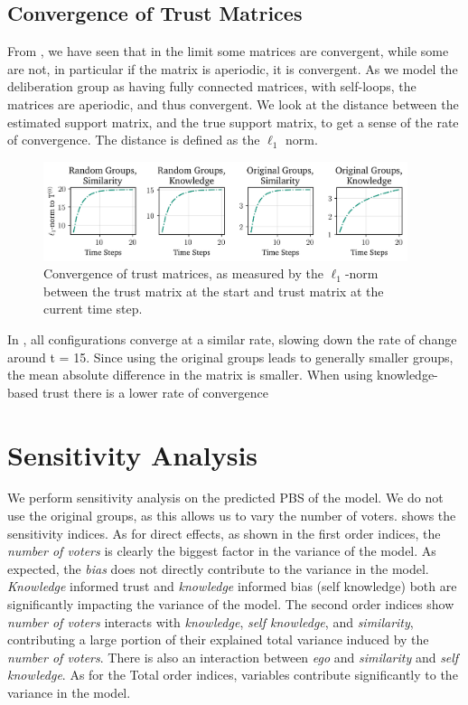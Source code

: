 \subsection{Convergence of Trust Matrices}

From , we have seen that in the limit some matrices are
convergent, while some are not, in particular if the matrix is aperiodic, it
is convergent. As we model the deliberation group as having fully connected
matrices, with self-loops, the matrices are aperiodic, and thus convergent. We look at the
distance between the estimated support matrix, and the true support matrix, to
get a sense of the rate of convergence. The distance is defined as the
$\ell_1$ norm.

\begin{figure}[ht]
	\begin{center}
		\includegraphics[width=0.95\textwidth]{Figures/convergence_groups.png}
	\end{center}
	\caption{Convergence of trust matrices, as measured by the $\ell_1$-norm between the trust matrix at the start and  trust matrix at the current time step.}\label{fig:convergence_big}
\end{figure}

In , all configurations converge at a
similar rate, slowing down the rate of change around t = 15. Since using the
original groups leads to generally smaller groups, the mean absolute difference in
the matrix is smaller. When using knowledge-based trust there is a lower rate
of convergence




\section{Sensitivity Analysis} We perform sensitivity analysis on the predicted
PBS of the model. We do not use the original groups, as this allows us to vary
the number of voters.  shows the sensitivity indices.
As for direct effects, as shown in the first order indices, the \textit{number
	of voters} is clearly the biggest factor in the variance of the model. As
expected, the \textit{bias} does not directly contribute to the variance in the
model. \textit{Knowledge} informed trust and\textit{ knowledge} informed bias
(self knowledge) both are significantly impacting the variance of the model.
The second order indices show \textit{number of voters} interacts with
\textit{knowledge}, \textit{self knowledge}, and\textit{ similarity},
contributing a large portion of their explained total variance induced by the
\textit{number of voters}. There is also an interaction between \textit{ego}
and \textit{similarity} and \textit{self knowledge}. As for the Total order
indices, variables contribute significantly to the variance in the
model.

